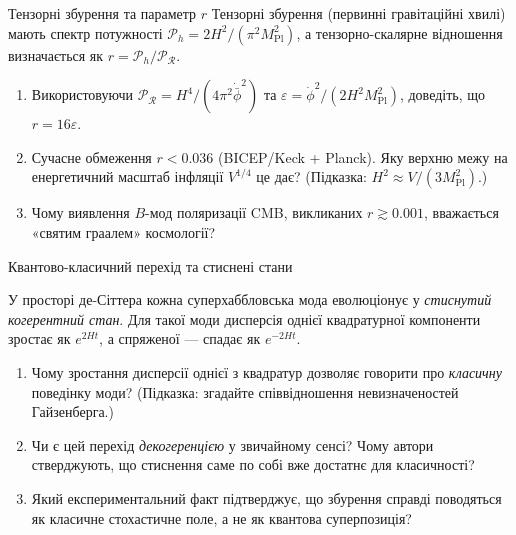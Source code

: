 \begin{problem}{Тензорні збурення та параметр $r$}
Тензорні збурення (первинні гравітаційні хвилі) мають спектр потужності
$\mathcal{P}_h = 2H^2/(\pi^2 M_{\mathrm{Pl}}^2)$, а тензорно-скалярне відношення
визначається як $r = \mathcal{P}_h / \mathcal{P}_{\mathcal{R}}$.

\begin{enumerate}
    \item Використовуючи $\mathcal{P}_{\mathcal{R}} = H^4/(4\pi^2\dot{\bar\phi}^2)$ та
          $\varepsilon = \dot{\phi}^2/(2H^2 M_{\mathrm{Pl}}^2)$, доведіть, що $r = 16\varepsilon$.
    \item Сучасне обмеження $r < 0.036$ (BICEP/Keck + Planck). Яку верхню межу
          на енергетичний масштаб інфляції $V^{1/4}$ це дає? (Підказка: $H^2 \approx V/(3M_{\mathrm{Pl}}^2)$.)
    \item Чому виявлення $B$-мод поляризації CMB, викликаних $r \gtrsim 0.001$,
          вважається «святим граалем» космології?
\end{enumerate}
\end{problem}


\begin{problem}{Квантово-класичний перехід та стиснені стани}

У просторі де-Сіттера кожна суперхаббловська мода еволюціонує у \emph{стиснутий
когерентний стан}. Для такої моди дисперсія однієї квадратурної компоненти
зростає як $e^{2Ht}$, а спряженої — спадає як $e^{-2Ht}$.

\begin{enumerate}
    \item Чому зростання дисперсії однієї з квадратур дозволяє говорити про
          \emph{класичну} поведінку моди? (Підказка: згадайте співвідношення
          невизначеностей Гайзенберга.)
    \item Чи є цей перехід \emph{декогеренцією} у звичайному сенсі? Чому автори
          \cite{polarski_starobinsky_1996} стверджують, що стиснення саме по собі
          вже достатнє для класичності?
    \item Який експериментальний факт підтверджує, що збурення справді поводяться
          як класичне стохастичне поле, а не як квантова суперпозиція?
\end{enumerate}
\end{problem}